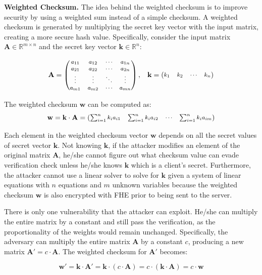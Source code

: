 \noindent\textbf{Weighted Checksum.} The idea behind the weighted checksum is to improve security by using a weighted sum instead of a simple checksum. A weighted checksum is generated by multiplying the secret key vector with the input matrix, creating a more secure hash value. Specifically, consider the input matrix \( \mathbf{A} \in \mathbb{R}^{m \times n} \) and the secret key vector \( \mathbf{k} \in \mathbb{R}^n \):

\[
\footnotesize
\mathbf{A} = \begin{pmatrix}
a_{11} & a_{12} & \cdots & a_{1n} \\
a_{21} & a_{22} & \cdots & a_{2n} \\
\vdots & \vdots & \ddots & \vdots \\
a_{m1} & a_{m2} & \cdots & a_{mn}
\end{pmatrix}, \quad
\mathbf{k} = \begin{pmatrix}
k_1 & k_2 & \cdots & k_n
\end{pmatrix}
\]

The weighted checksum \( \mathbf{w} \) can be computed as:
\[
\footnotesize
\mathbf{w} = \mathbf{k} \cdot \mathbf{A} 
=
\begin{pmatrix}
\sum_{i=1}^n k_i a_{i1} & \sum_{i=1}^n k_i a_{i2} & \cdots & \sum_{i=1}^n k_i a_{im}
\end{pmatrix}
\]

Each element in the weighted checksum vector \( \mathbf{w} \) depends on all the secret values of secret vector $\mathbf{k}$. Not knowing $\mathbf{k}$, if the attacker modifies an element of the original matrix $\mathbf{A}$, he/she cannot figure out what checksum value can evade verification check unless he/she knows $\mathbf{k}$ which is a client's secret. Furthermore, the attacker cannot use a linear solver to solve for $\mathbf{k}$ given a system of linear equations with $n$ equations and $m$ unknown variables because the weighted checksum $\mathbf{w}$ is also encrypted with FHE prior to being sent to the server. 

There is only one vulnerability that the attacker can exploit. He/she can multiply the entire matrix by a constant and still pass the verification, as the proportionality of the weights would remain unchanged. Specifically, the adversary can multiply the entire matrix \( \mathbf{A} \) by a constant \( c \), producing a new matrix \( \mathbf{A}' = c \cdot \mathbf{A} \). The weighted checksum for \( \mathbf{A}' \) becomes:

\[
\mathbf{w}' = \mathbf{k} \cdot \mathbf{A}' = \mathbf{k} \cdot (c \cdot \mathbf{A}) = c \cdot (\mathbf{k} \cdot \mathbf{A}) = c \cdot \mathbf{w}
\]

